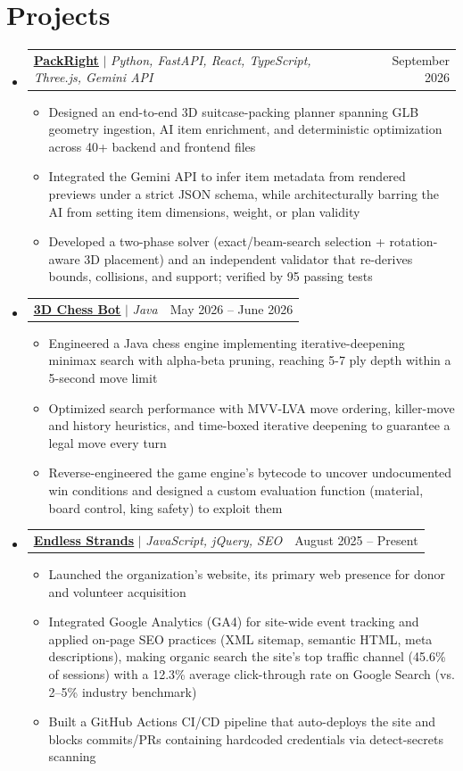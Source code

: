 \documentclass[letterpaper,11pt]{article}
\makeatletter
\newcommand{\resumeItem}[1]{
  \item\small{
    {#1 \vspace{-2pt}}
  }
}
\newcommand{\resumeProjectHeading}[2]{
    \item
    \begin{tabular*}{0.97\textwidth}{l@{\extracolsep{\fill}}r}
      \small#1 & #2 \\
    \end{tabular*}\vspace{-7pt}
}
\newcommand{\resumeSubHeadingListStart}{\begin{itemize}[leftmargin=0.15in, label={}]}
\newcommand{\resumeSubHeadingListEnd}{\end{itemize}}
\newcommand{\resumeItemListStart}{\begin{itemize}}
\newcommand{\resumeItemListEnd}{\end{itemize}\vspace{-5pt}}
\makeatother
\begin{document}
\section{Projects}
    \resumeSubHeadingListStart
      \resumeProjectHeading
          {\textbf{\href{https://github.com/washere1/packright}{\underline{PackRight}}} $|$ \emph{Python, FastAPI, React, TypeScript, Three.js, Gemini API}}{September 2026}
          \resumeItemListStart
            \resumeItem{Designed an end-to-end 3D suitcase-packing planner spanning GLB geometry ingestion, AI item enrichment, and deterministic optimization across 40+ backend and frontend files}
            \resumeItem{Integrated the Gemini API to infer item metadata from rendered previews under a strict JSON schema, while architecturally barring the AI from setting item dimensions, weight, or plan validity}
            \resumeItem{Developed a two-phase solver (exact/beam-search selection + rotation-aware 3D placement) and an independent validator that re-derives bounds, collisions, and support; verified by 95 passing tests}
          \resumeItemListEnd
      \resumeProjectHeading
          {\textbf{\href{https://github.com/jessica-lr-song/3d-chess-bot}{\underline{3D Chess Bot}}} $|$ \emph{Java}}{May 2026 -- June 2026}
          \resumeItemListStart
            \resumeItem{Engineered a Java chess engine implementing iterative-deepening minimax search with alpha-beta pruning, reaching 5-7 ply depth within a 5-second move limit}
            \resumeItem{Optimized search performance with MVV-LVA move ordering, killer-move and history heuristics, and time-boxed iterative deepening to guarantee a legal move every turn}
            \resumeItem{Reverse-engineered the game engine's bytecode to uncover undocumented win conditions and designed a custom evaluation function (material, board control, king safety) to exploit them}
          \resumeItemListEnd
      \resumeProjectHeading
          {\textbf{\href{https://endlessstrands.org}{\underline{Endless Strands}}} $|$ \emph{JavaScript, jQuery, SEO}}{August 2025 -- Present}
          \resumeItemListStart
            \resumeItem{Launched the organization's website, its primary web presence for donor and volunteer acquisition}
            \resumeItem{Integrated Google Analytics (GA4) for site-wide event tracking and applied on-page SEO practices (XML sitemap, semantic HTML, meta descriptions), making organic search the site's top traffic channel (45.6\% of sessions) with a 12.3\% average click-through rate on Google Search (vs. 2--5\% industry benchmark)}
            \resumeItem{Built a GitHub Actions CI/CD pipeline that auto-deploys the site and blocks commits/PRs containing hardcoded credentials via detect-secrets scanning}
          \resumeItemListEnd
    \resumeSubHeadingListEnd
\end{document}
